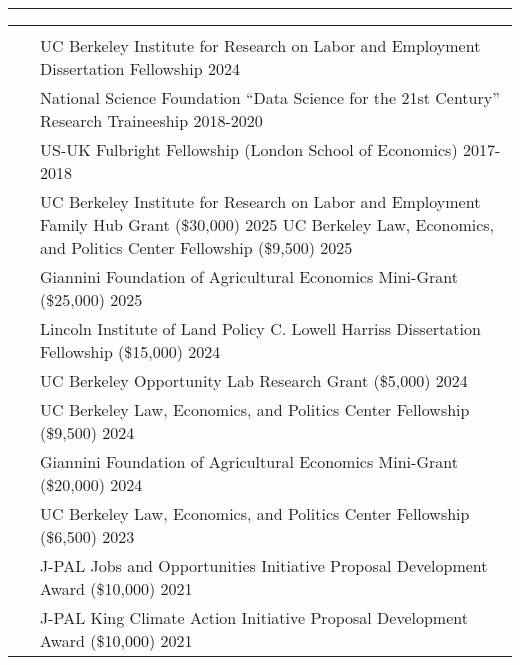 \documentclass[letterpaper,10pt,oneside]{article}
\newenvironment{myresume}[2]{\pdfbookmark{#1}{#1}{\LARGE{\textbf{#1}}}\vspace{1mm}\hrule\vspace{-2mm}\begin{longtable}{p{0.12\textwidth} p{0.8\textwidth}}&#2}{\end{longtable}}
\renewcommand{\section}[2]{\vspace{-1.5em}\\\pdfbookmark{#1}{#2}{\singlespace\textsc{#1}}&}
\newcommand{\firstentry}[1]{\vspace{0em}\newline#1\vspace{0em}}
\newcommand{\entry}[1]{\vspace{-1em}\\~&#1}
\begin{document}
\begin{myresume}{}
\section{Awards}{awards}

\firstentry{UC Berkeley Institute for Research on Labor and Employment Dissertation Fellowship \hfill 2024
}

\entry{National Science Foundation “Data Science for the 21st Century” Research Traineeship
\hfill 2018-2020
}

\entry{US-UK Fulbright Fellowship (London School of Economics) \hfill 2017-2018
}


\section{Research \newline Grants}{grants}

\firstentry{UC Berkeley Institute for Research on Labor and Employment Family Hub Grant (\$30,000) \hspace{1.35cm} 2025 %
\newline UC Berkeley Law, Economics, and Politics Center Fellowship (\$9,500) \hfill 2025
}

\entry{Giannini Foundation of Agricultural Economics Mini-Grant (\$25,000) \hfill 2025
}

\entry{Lincoln Institute of Land Policy C. Lowell Harriss Dissertation Fellowship (\$15,000) \hfill 2024
}

\entry{UC Berkeley Opportunity Lab Research Grant (\$5,000) \hfill 2024
}

\entry{ UC Berkeley Law, Economics, and Politics Center Fellowship (\$9,500) \hfill 2024
}

\entry{Giannini Foundation of Agricultural Economics Mini-Grant (\$20,000) \hfill 2024
}

\entry{UC Berkeley Law, Economics, and Politics Center Fellowship (\$6,500) \hfill 2023
}

\entry{J-PAL Jobs and Opportunities Initiative Proposal Development Award (\$10,000) \hfill 2021
}

\entry{J-PAL King Climate Action Initiative Proposal Development Award (\$10,000) \hfill 2021
}



\end{myresume}
\end{document}
